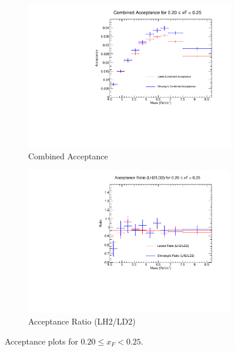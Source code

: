 \documentclass[11pt]{article}
\begin{document}
\begin{figure}[p]
\begin{subfigure}[b]{0.48\textwidth}
       \includegraphics[width=\linewidth]{./acceptancePlots/Combined_acceptance_xF_bin_4.pdf}
       \caption{Combined Acceptance}
    \end{subfigure}\hfill
    \begin{subfigure}[b]{0.48\textwidth}
       \includegraphics[width=\linewidth]{./acceptancePlots/Acceptance_ratio_xF_bin_4.pdf}
       \caption{Acceptance Ratio (LH2/LD2)}
    \end{subfigure}
    \caption{Acceptance plots for $0.20 \le x_F < 0.25$.}
\end{figure}
\end{document}
